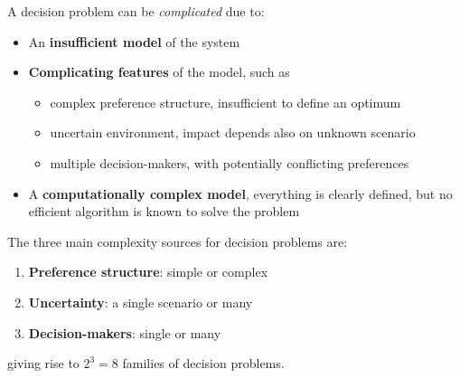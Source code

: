 A decision problem can be \textit{complicated} due to:
\begin{itemize}
	\item An \textbf{insufficient model} of the system
	
	\item \textbf{Complicating features} of the model, such as
	\begin{itemize}
		\item complex preference structure, insufficient to define an optimum
		
		\item uncertain environment, impact depends also on unknown scenario
		
		\item multiple decision-makers, with potentially conflicting preferences
	\end{itemize}
	
	\item A \textbf{computationally complex model}, everything is clearly defined, but no efficient algorithm is known to solve the problem
\end{itemize}

The three main complexity sources for decision problems are: 
\begin{enumerate}
	\item \textbf{Preference structure}: simple or complex
	
	\item \textbf{Uncertainty}: a single scenario or many 
	
	\item \textbf{Decision-makers}: single or many
\end{enumerate}
giving rise to $2^3 = 8$ families of decision problems.

